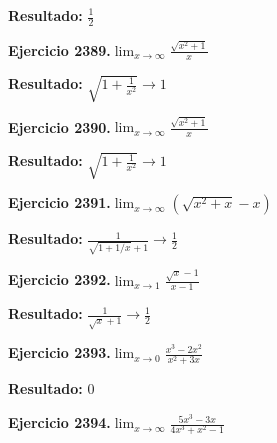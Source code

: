 \documentclass[10pt,a4paper]{article}
\begin{document}
\begin{solbox}
\textbf{Resultado:} \(\displaystyle \frac{1}{2}\)
\end{solbox}

\begin{ejbox}
\textbf{Ejercicio 2389.}\quad $\lim_{x\to \infty} \frac{\sqrt{x^2+1}}{x}$
\end{ejbox}

\begin{solbox}
\textbf{Resultado:} \(\displaystyle \sqrt{1+\frac{1}{x^2}} \to 1\)
\end{solbox}

\newpage
\begin{ejbox}
\textbf{Ejercicio 2390.}\quad $\lim_{x\to \infty} \frac{\sqrt{x^2+1}}{x}$
\end{ejbox}

\begin{solbox}
\textbf{Resultado:} \(\displaystyle \sqrt{1+\frac{1}{x^2}} \to 1\)
\end{solbox}

\begin{ejbox}
\textbf{Ejercicio 2391.}\quad $\lim_{x\to \infty} (\sqrt{x^2+x} - x)$
\end{ejbox}

\begin{solbox}
\textbf{Resultado:} \(\displaystyle \frac{1}{\sqrt{1+1/x}+1} \to \frac{1}{2}\)
\end{solbox}

\begin{ejbox}
\textbf{Ejercicio 2392.}\quad $\lim_{x\to 1} \frac{\sqrt{x}-1}{x-1}$
\end{ejbox}

\begin{solbox}
\textbf{Resultado:} \(\displaystyle \frac{1}{\sqrt{x}+1} \to \frac{1}{2}\)
\end{solbox}

\newpage
\begin{ejbox}
\textbf{Ejercicio 2393.}\quad $\lim_{x\to 0} \frac{x^3-2x^2}{x^2+3x}$
\end{ejbox}

\begin{solbox}
\textbf{Resultado:} \(\displaystyle 0\)
\end{solbox}

\begin{ejbox}
\textbf{Ejercicio 2394.}\quad $\lim_{x\to \infty} \frac{5x^3 - 3x}{4x^3 + x^2 - 1}$
\end{ejbox}
\end{document}
